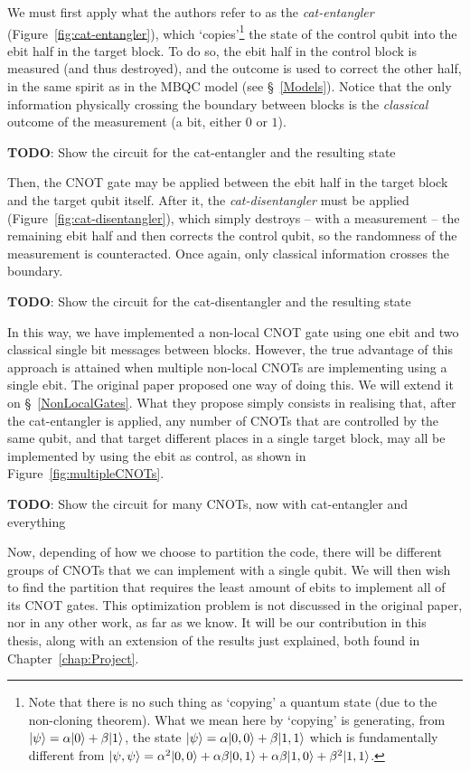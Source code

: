 We must first apply what the authors refer to as the \textit{cat-entangler} (Figure~\ref{fig:cat-entangler}), which `copies'\footnote{Note that there is no such thing as `copying' a quantum state (due to the non-cloning theorem). What we mean here by `copying' is generating, from \(\vert \psi \rangle = \alpha\vert 0 \rangle + \beta\vert 1 \rangle\), the state \(\vert \psi \rangle = \alpha\vert 0,0 \rangle + \beta\vert 1,1 \rangle\) which is fundamentally different from \(\vert \psi,\psi \rangle = \alpha^2\vert 0,0 \rangle + \alpha\beta\vert 0,1 \rangle + \alpha\beta\vert 1,0 \rangle + \beta^2\vert 1,1 \rangle\).} the state of the control qubit into the ebit half in the target block. To do so, the ebit half in the control block is measured (and thus destroyed), and the outcome is used to correct the other half, in the same spirit as in the MBQC model (see \S~\ref{Models}). Notice that the only information physically crossing the boundary between blocks is the \textit{classical} outcome of the measurement (a bit, either \(0\) or \(1\)).

\textbf{TODO}: Show the circuit for the cat-entangler and the resulting state

Then, the CNOT gate may be applied between the ebit half in the target block and the target qubit itself. After it, the \textit{cat-disentangler} must be applied (Figure~\ref{fig:cat-disentangler}), which simply destroys -- with a measurement -- the remaining ebit half and then corrects the control qubit, so the randomness of the measurement is counteracted. Once again, only classical information crosses the boundary.

\textbf{TODO}: Show the circuit for the cat-disentangler and the resulting state

In this way, we have implemented a non-local CNOT gate using one ebit and two classical single bit messages between blocks. However, the true advantage of this approach is attained when multiple non-local CNOTs are implementing using a single ebit. The original paper \citep{NonLocalCNOT} proposed one way of doing this. We will extend it on \S~\ref{NonLocalGates}. What they propose simply consists in realising that, after the cat-entangler is applied, any number of CNOTs that are controlled by the same qubit, and that target different places in a single target block, may all be implemented by using the ebit as control, as shown in Figure~\ref{fig:multipleCNOTs}.

\textbf{TODO}: Show the circuit for many CNOTs, now with cat-entangler and everything

Now, depending of how we choose to partition the code, there will be different groups of CNOTs that we can implement with a single qubit. We will then wish to find the partition that requires the least amount of ebits to implement all of its CNOT gates. This optimization problem is not discussed in the original paper, nor in any other work, as far as we know. It will be our contribution in this thesis, along with an extension of the results just explained, both found in Chapter~\ref{chap:Project}.